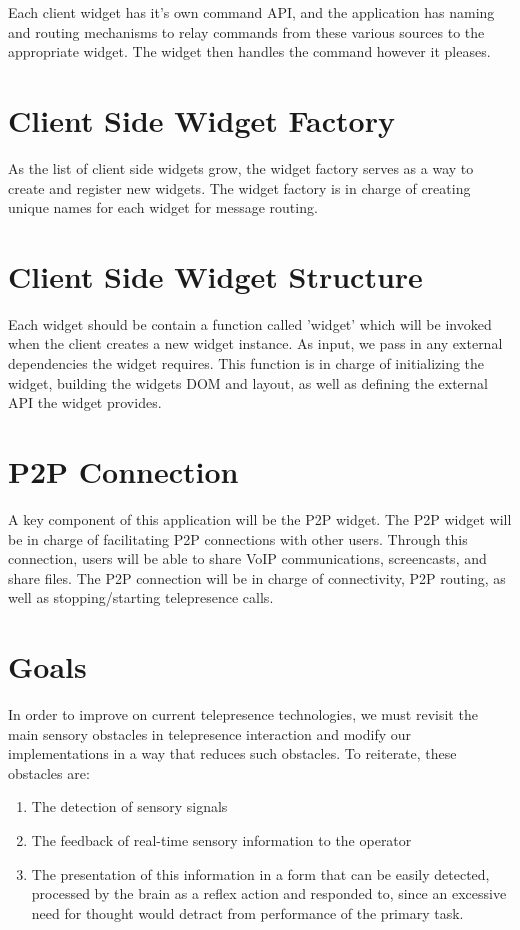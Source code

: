 \documentclass[a4paper,12pt]{report}
\begin{document}
Each client widget has it's own command API, and the application has naming and routing mechanisms to relay commands from these various sources to the appropriate widget. The widget then handles the command however it pleases.
\section{Client Side Widget Factory}
As the list of client side widgets grow, the widget factory serves as a way to create and register new widgets. The widget factory is in charge of creating unique names for each widget for message routing.
\section{Client Side Widget Structure}
Each widget should be contain a function called 'widget' which will be invoked when the client creates a new widget instance. As input, we pass in any external dependencies the widget requires. This function is in charge of initializing the widget, building the widgets DOM and layout, as well as defining the external API the widget provides.
\section{P2P Connection}
A key component of this application will be the P2P widget. The P2P widget will be in charge of facilitating P2P connections with other users. Through this connection, users will be able to share VoIP communications, screencasts, and share files. The P2P connection will be in charge of connectivity, P2P routing, as well as stopping/starting telepresence calls.
\section{Goals}

In order to improve on current telepresence technologies, we must revisit the main sensory obstacles in telepresence interaction and modify our implementations in a way that reduces such obstacles. To reiterate, these obstacles are:
	\begin{enumerate}
		\item The detection of sensory signals
		\item The feedback of real-time sensory information to the operator
		\item The presentation of this information in a form that can be easily detected, processed by the brain as a reflex action and responded to, since an excessive need for thought would detract from performance of the primary task.
	\end{enumerate}
	\begin{flushright}
		\cite{540147}
	\end{flushright}
\end{document}
